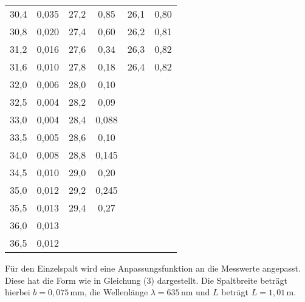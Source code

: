\begin{longtable}{S[table-format=3.2] S[table-format=3.2] S[table-format=3.2] S[table-format=3.2] S[table-format=3.2] S[table-format=3.2]}
          30,4   &   0,035  &     27,2    &  0,85   & 26,1   &   0,80                                      \\
          30,8   &   0,020  &     27,4    &  0,60   & 26,2   &   0,81                                      \\
          31,2   &   0,016  &     27,6    &  0,34   & 26,3   &   0,82                                      \\
          31,6   &   0,010  &     27,8    &  0,18   & 26,4   &   0,82                                      \\
          32,0   &   0,006  &     28,0    &  0,10                                                          \\
          32,5   &   0,004  &     28,2    &  0,09                                                          \\
          33,0   &   0,004  &     28,4    &  0,088                                                          \\
          33,5   &   0,005  &     28,6    &  0,10                                     \\
          34,0   &   0,008  &     28,8    &  0,145                                     \\
          34,5   &   0,010  &     29,0    &  0,20                                     \\
          35,0   &   0,012  &     29,2    &  0,245                                     \\
          35,5   &   0,013  &     29,4    &  0,27                                     \\
          36,0   &   0,013  &                                     \\
          36,5   &   0,012  &                                     \\
                \bottomrule
\end{longtable}

Für den Einzelspalt wird eine Anpassungsfunktion an die Messwerte angepasst. Diese hat die Form wie
in Gleichung (3) dargestellt. Die Spaltbreite beträgt hierbei $b=0,075\,$mm, die Wellenlänge $\lambda = 635\,$nm
und $L$ beträgt $L=1,01\,$m.


